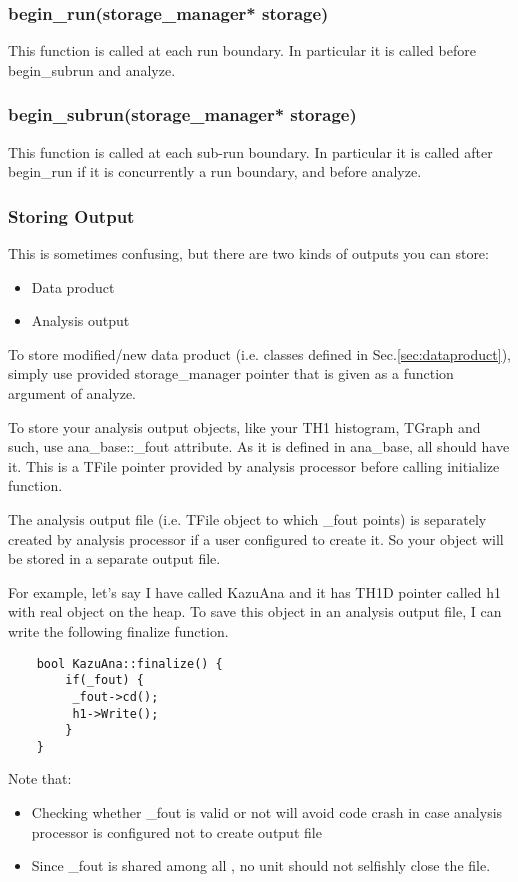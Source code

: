 \subsubsection{{\ttfamily begin\_run(storage\_manager* storage)}}
This function is called at each run boundary. In particular it is called before {\ttfamily begin\_subrun} and {\ttfamily analyze}.

\subsubsection{{\ttfamily begin\_subrun(storage\_manager* storage)}}
This function is called at each sub-run boundary.
In particular it is called after {\ttfamily begin\_run} if it is concurrently a run boundary, and before {\ttfamily analyze}.

\subsubsection{Storing Output}
This is sometimes confusing, but there are two kinds of outputs you can store:
\begin{itemize}
\item Data product
\item Analysis output
\end{itemize}

To store modified/new data product (i.e. classes defined in Sec.\ref{sec:dataproduct}), simply use provided {\ttfamily storage\_manager} pointer that is given as a function argument of {\ttfamily analyze}. 

To store your analysis output \ROOT objects, like your {\ttfamily TH1} histogram, {\ttfamily TGraph} and such, use {\ttfamily ana\_base::\_fout} attribute. As it is defined in {\ttfamily ana\_base}, all \anaunit should have it. This is a {\ttfamily TFile} pointer provided by analysis processor before calling {\ttfamily initialize} function. 

The analysis output file (i.e. {\ttfamily TFile} object to which {\ttfamily \_fout} points) is separately created by analysis processor if a user configured to create it. So your object will be stored in a separate output \ROOT file.

For example, let's say I have \anaunit called {\ttfamily KazuAna} and it has {\ttfamily TH1D} pointer called {\ttfamily h1} with real object on the heap. To save this object in an analysis output file, I can write the following {\ttfamily finalize} function.
\begin{lstlisting}
    bool KazuAna::finalize() {
        if(_fout) {
         _fout->cd();
         h1->Write();
        }
    }
\end{lstlisting}
Note that:
\begin{itemize}
\item Checking whether {\ttfamily \_fout} is valid or not will avoid code crash in case analysis processor is configured not to create output file
\item Since {\ttfamily \_fout} is shared among all \anaunit, no unit should not selfishly close the file.
\end{itemize}


